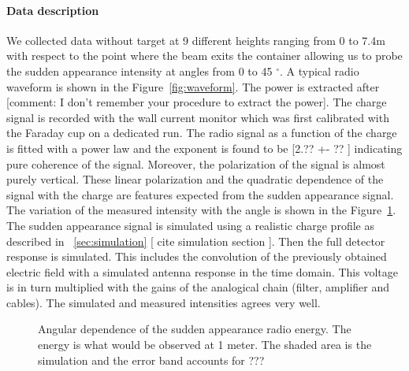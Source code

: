 \documentclass[12pt]{article}
\begin{document}
\paragraph{Data description}
We collected data without target at 9 different heights ranging from 0 to 7.4m with respect to the point where the beam exits the container allowing us to probe the sudden appearance intensity at angles from 0 to 45 $^{\circ}$. A typical radio waveform is shown in the Figure~\ref{fig:waveform}. The power is extracted after \color{red} [comment: I don't remember your procedure to extract the power]\color{black}. The charge signal is recorded with the wall current monitor which was first calibrated with the Faraday cup on a dedicated run. The radio signal as a function of the charge is fitted with a power law and the exponent is found to be \color{red} [2.?? +- ?? ]\color{black} indicating pure coherence of the signal. Moreover, the polarization of the signal is almost purely vertical. These linear polarization and the quadratic dependence of the signal with the charge are features expected from the sudden appearance signal. \\ The variation of the measured intensity with the angle is shown in the Figure~\ref{fig:angdist}. The sudden appearance signal is simulated using a realistic charge profile as described in ~\ref{sec:simulation}\color{red} [ cite simulation section ]\color{black}. Then the full detector response is simulated. This includes the convolution of the previously obtained electric field  with a simulated antenna response in the time domain. This voltage is in turn multiplied with the gains of the analogical chain (filter, amplifier and cables). The simulated and measured intensities agrees very well.

\begin{figure}[!h]
  \centering
  \hspace*{-3ex}
  		        \caption{Angular dependence of the sudden appearance radio energy. The energy is what would be observed at 1 meter. The shaded area is the simulation and the error band accounts for \color{red} ??? \color{black}}
  \label{fig:angdist}
\end{figure}
\end{document}
